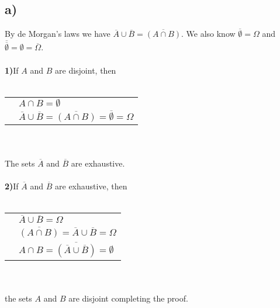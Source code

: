 \documentclass[12pt]{article}
\begin{document}
\subsection*{a)}
By de Morgan's laws we have $\overline{A} \cup \overline{B} = \overline{(A \cap B)}$.
We also know $\overline{\emptyset}=\Omega$ and $\overline{\overline{\emptyset}}=\emptyset=\overline{\Omega}$.
\\ \\
\textbf{1)}If $A$ and $B$ are disjoint, then
\\ \\
\begin{tabular}{l l}
    &$A \cap B = \emptyset$\\
    &$\overline{A} \cup \overline{B} = \overline{(A \cap B)} = \overline{\emptyset}=\Omega$\\
\end{tabular}
\\ \\
The sets $\overline{A}$ and $\overline{B}$ are exhaustive.
\\ \\
\textbf{2)}If $\overline{A}$ and $\overline{B}$ are exhaustive, then
\\ \\
\begin{tabular}{l l}
    &$\overline{A} \cup \overline{B} = \Omega$\\
    &$\overline{(A \cap B)}=\overline{A} \cup \overline{B} = \Omega$\\
    &$A \cap B = \overline{(\overline{A} \cup \overline{B})} = \emptyset$\\
\end{tabular}
\\ \\
the sets $A$ and $B$ are disjoint completing the proof.
\end{document}
